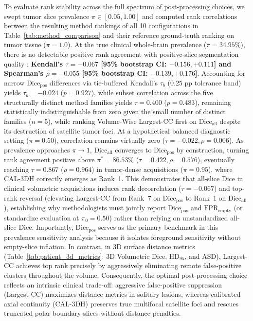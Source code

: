 \documentclass[11pt,a4paper]{article}
\begin{document}
To evaluate rank stability across the full spectrum of post-processing choices, we swept tumor slice prevalence $\pi \in [0.05, 1.00]$ and computed rank correlations between the resulting method rankings of all 10 configurations in Table~\ref{tab:method_comparison} and their reference ground-truth ranking on tumor tissue ($\pi = 1.0$). At the true clinical whole-brain prevalence ($\pi = 34.95\%$), there is no detectable positive rank agreement with positive-slice segmentation quality : \textbf{Kendall's $\tau = -0.067$ [95\% bootstrap CI: $-0.156, +0.111$] and Spearman's $\rho = -0.055$ [95\% bootstrap CI: $-0.139, +0.176$]}. Accounting for narrow $\text{Dice}_{\text{pos}}$ differences via tie-buffered Kendall's $\tau_b$ ($0.25\text{ pp}$ tolerance band) yields $\tau_b = -0.024$ ($p = 0.927$), while subset correlation across the five structurally distinct method families yields $\tau = 0.400$ ($p = 0.483$), remaining statistically indistinguishable from zero given the small number of distinct families ($n = 5$), while ranking Volume-Wise Largest-CC first on $\text{Dice}_{\text{all}}$ despite its destruction of satellite tumor foci. At a hypothetical balanced diagnostic setting ($\pi = 0.50$), correlation remains virtually zero ($\tau = -0.022, \rho = 0.006$). As prevalence approaches $\pi \to 1$, $\text{Dice}_{\text{all}}$ converges to $\text{Dice}_{\text{pos}}$ by construction, turning rank agreement positive above $\pi^* = 86.53\%$ ($\tau = 0.422, \rho = 0.576$), eventually reaching $\tau = 0.867$ ($\rho = 0.964$) in tumor-dense acquisitions ($\pi = 0.95$), where CAL-3DH correctly emerges as Rank~1. This demonstrates that all-slice Dice in clinical volumetric acquisitions induces rank decorrelation ($\tau = -0.067$) and top-rank reversal (elevating Largest-CC from Rank~7 on $\text{Dice}_{\text{pos}}$ to Rank~1 on $\text{Dice}_{\text{all}}$), establishing why methodologists must jointly report $\text{Dice}_{\text{pos}}$ and $\text{FPR}_{\text{empty}}$ (or standardize evaluation at $\pi_0 = 0.50$) rather than relying on unstandardized all-slice Dice. Importantly, $\text{Dice}_{\text{pos}}$ serves as the primary benchmark in this prevalence sensitivity analysis because it isolates foreground sensitivity without empty-slice inflation. In contrast, in 3D surface distance metrics (Table~\ref{tab:patient_3d_metrics}: 3D Volumetric Dice, $\text{HD}_{95}$, and ASD), Largest-CC achieves top rank precisely by aggressively eliminating remote false-positive clusters throughout the volume. Consequently, the optimal post-processing choice reflects an intrinsic clinical trade-off: aggressive false-positive suppression (Largest-CC) maximizes distance metrics in solitary lesions, whereas calibrated axial continuity (CAL-3DH) preserves true multifocal satellite foci and rescues truncated polar boundary slices without distance penalties.
\end{document}
